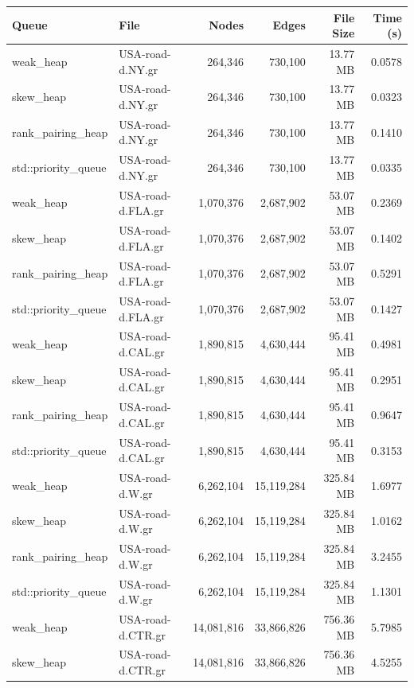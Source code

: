 \begin{table}[ht]
\centering
\begin{tabular}{|l|l|r|r|r|r|}
\hline
\textbf{Queue} & \textbf{File} & \textbf{Nodes} & \textbf{Edges} & \textbf{File Size} & \textbf{Time (s)} \\
\hline
weak\_heap         & USA-road-d.NY.gr   & 264,346    & 730,100     & 13.77 MB  & 0.0578 \\
skew\_heap         & USA-road-d.NY.gr   & 264,346    & 730,100     & 13.77 MB  & 0.0323 \\
rank\_pairing\_heap & USA-road-d.NY.gr   & 264,346    & 730,100     & 13.77 MB  & 0.1410 \\
std::priority\_queue & USA-road-d.NY.gr  & 264,346    & 730,100     & 13.77 MB  & 0.0335 \\
\hline
weak\_heap         & USA-road-d.FLA.gr  & 1,070,376  & 2,687,902   & 53.07 MB  & 0.2369 \\
skew\_heap         & USA-road-d.FLA.gr  & 1,070,376  & 2,687,902   & 53.07 MB  & 0.1402 \\
rank\_pairing\_heap & USA-road-d.FLA.gr  & 1,070,376  & 2,687,902   & 53.07 MB  & 0.5291 \\
std::priority\_queue & USA-road-d.FLA.gr & 1,070,376  & 2,687,902   & 53.07 MB  & 0.1427 \\
\hline
weak\_heap         & USA-road-d.CAL.gr  & 1,890,815  & 4,630,444   & 95.41 MB  & 0.4981 \\
skew\_heap         & USA-road-d.CAL.gr  & 1,890,815  & 4,630,444   & 95.41 MB  & 0.2951 \\
rank\_pairing\_heap & USA-road-d.CAL.gr  & 1,890,815  & 4,630,444   & 95.41 MB  & 0.9647 \\
std::priority\_queue & USA-road-d.CAL.gr & 1,890,815  & 4,630,444   & 95.41 MB  & 0.3153 \\
\hline
weak\_heap         & USA-road-d.W.gr    & 6,262,104  & 15,119,284  & 325.84 MB & 1.6977 \\
skew\_heap         & USA-road-d.W.gr    & 6,262,104  & 15,119,284  & 325.84 MB & 1.0162 \\
rank\_pairing\_heap & USA-road-d.W.gr    & 6,262,104  & 15,119,284  & 325.84 MB & 3.2455 \\
std::priority\_queue & USA-road-d.W.gr   & 6,262,104  & 15,119,284  & 325.84 MB & 1.1301 \\
\hline
weak\_heap         & USA-road-d.CTR.gr  & 14,081,816 & 33,866,826  & 756.36 MB & 5.7985 \\
skew\_heap         & USA-road-d.CTR.gr  & 14,081,816 & 33,866,826  & 756.36 MB & 4.5255 \\

\end{tabular}
\end{table}
